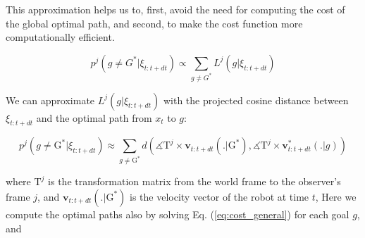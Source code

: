 This approximation helps us to, first, avoid the need for computing the cost of the global optimal path,
and second, to make the cost function more computationally efficient.

\noindent

\begin{equation}
    \label{eq:prob_leg}
    p^j(g \neq G^* | \xi_{t:t+dt}) \propto \sum_{g \neq G^*} L^j(g | \xi_{t:t+dt})
\end{equation}

We can approximate $L^j(g | \xi_{t:t+dt})$ with the projected cosine distance between $\xi_{t:t+dt}$ and the optimal path from $x_t$ to $g$:

\begin{equation}
    \label{eq:prob_leg_approx}
    p^j(g \neq \mathrm G^* | \xi_{t:t+dt}) \approx \sum_{g \neq \mathrm G^*}  d (\measuredangle \mathrm T^j \times \mathbf{v}_{t:t+dt}(.|\mathrm G^*),
                                                                 \measuredangle \mathrm T^j \times \mathbf{v}^*_{t:t+dt}(.|g))
\end{equation}

\noindent
where $\mathrm T^j$ is the transformation matrix from the world frame to the observer's frame $j$,
and $\mathbf{v}_{t:t+dt}(.|\mathrm G^*)$ is the velocity vector of the robot at time $t$,
Here we compute the optimal paths also by solving Eq. (\ref{eq:cost_general}) for each goal $g$, and

